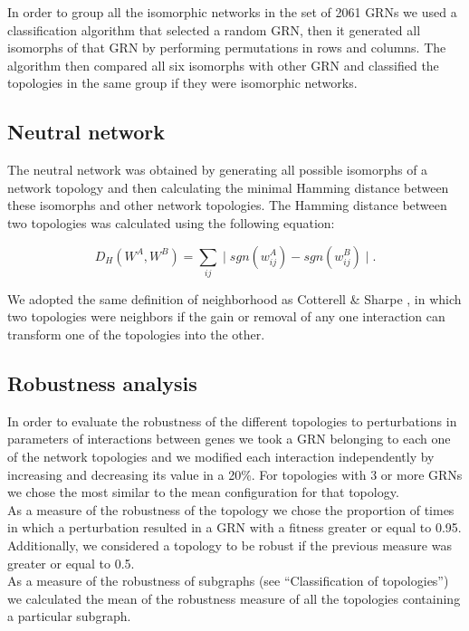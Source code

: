 \documentclass[10pt,letterpaper]{article}
\begin{document}
In order to group all the isomorphic networks in the set of 2061 GRNs we used a
classification algorithm that selected a random GRN, then it generated all 
isomorphs of that GRN by performing permutations in rows and columns. The 
algorithm then compared all six isomorphs with other GRN and classified the 
topologies in the same group if they were isomorphic networks.

\subsection*{Neutral network}

The neutral network was obtained by generating all possible isomorphs of a 
network topology and then calculating the minimal Hamming distance between these
isomorphs and other network topologies. The Hamming distance between two 
topologies was calculated using the following equation:

\begin{equation}
 D_H(W^A, W^B) = \sum_{ij} \mid sgn(w_{ij}^A) - sgn(w^B_{ij}) \mid .
\end{equation}

We adopted the same definition of neighborhood as Cotterell \& Sharpe 
\cite{Cotterell2010}, in which two topologies were neighbors if the gain or 
removal of any one interaction can transform one of the topologies into the 
other.

\subsection*{Robustness analysis}

In order to evaluate the robustness of the different topologies to perturbations
in parameters of interactions between genes we took a GRN belonging to each one 
of the network topologies and we modified each interaction independently by 
increasing and decreasing its value in a 20\%. For topologies with 3 or more 
GRNs we chose the most similar to the mean configuration for that topology.\\

As a measure of the robustness of the topology we chose the proportion of times 
in which a perturbation resulted in a GRN with a fitness greater or equal to 
0.95. Additionally, we considered a topology to be robust if the previous 
measure was greater or equal to 0.5.\\

As a measure of the robustness of subgraphs (see “Classification of topologies”)
we calculated the mean of the robustness measure of all the topologies 
containing a particular subgraph.\\
\end{document}
